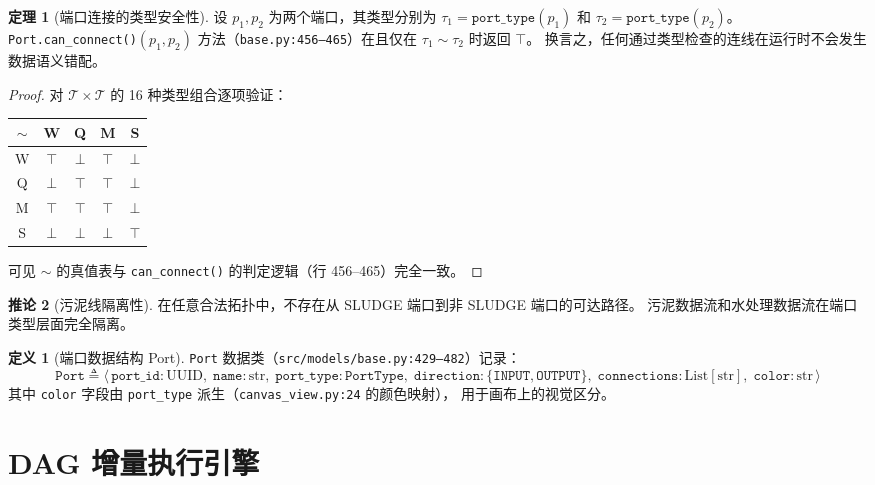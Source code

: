 \documentclass[12pt,a4paper]{ctexart}
\theoremstyle{definition}
\newtheorem{definition}{定义}[section]
\newtheorem{theorem}{定理}[section]
\newtheorem{corollary}[theorem]{推论}
\theoremstyle{remark}
\begin{document}
\begin{theorem}[端口连接的类型安全性]
\label{thm:type-safety}
设 $p_1, p_2$ 为两个端口，其类型分别为 $\tau_1 = \texttt{port\_type}(p_1)$ 和 $\tau_2 = \texttt{port\_type}(p_2)$。
\texttt{Port.can\_connect()}$(p_1, p_2)$ 方法（\texttt{base.py:456--465}）在且仅在 $\tau_1 \sim \tau_2$ 时返回 $\top$。
换言之，任何通过类型检查的连线在运行时不会发生数据语义错配。
\end{theorem}
\begin{proof}
对 $\mathcal{T} \times \mathcal{T}$ 的 16 种类型组合逐项验证：
\begin{center}
\begin{tabular}{c|cccc}
$\sim$ & W & Q & M & S \\
\hline
W & $\top$ & $\bot$ & $\top$ & $\bot$ \\
Q & $\bot$ & $\top$ & $\top$ & $\bot$ \\
M & $\top$ & $\top$ & $\top$ & $\bot$ \\
S & $\bot$ & $\bot$ & $\bot$ & $\top$ \\
\end{tabular}
\end{center}
可见 $\sim$ 的真值表与 \texttt{can\_connect()} 的判定逻辑（行 456--465）完全一致。
\end{proof}

\begin{corollary}[污泥线隔离性]
\label{cor:sludge-isolation}
在任意合法拓扑中，不存在从 SLUDGE 端口到非 SLUDGE 端口的可达路径。
污泥数据流和水处理数据流在端口类型层面完全隔离。
\end{corollary}

\begin{definition}[端口数据结构 Port]
\label{def:port}
\texttt{Port} 数据类（\texttt{src/models/base.py:429--482}）记录：
\[
\texttt{Port} \triangleq \langle\,
  \texttt{port\_id}: \text{UUID},\;
  \texttt{name}: \text{str},\;
  \texttt{port\_type}: \texttt{PortType},\;
  \texttt{direction}: \{\texttt{INPUT}, \texttt{OUTPUT}\},\;
  \texttt{connections}: \text{List}[\text{str}],\;
  \texttt{color}: \text{str}
\,\rangle
\]
其中 \texttt{color} 字段由 \texttt{port\_type} 派生（\texttt{canvas\_view.py:24} 的颜色映射），
用于画布上的视觉区分。
\end{definition}

\section{DAG 增量执行引擎}\label{sec:dag-engine}
\end{document}
